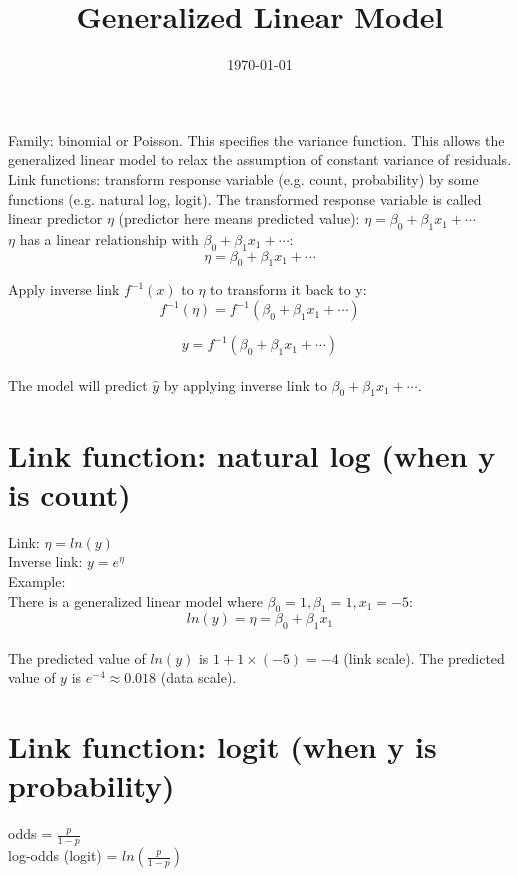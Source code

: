 \documentclass[12pt]{article}
\title{Generalized Linear Model}
\date{\today}
\begin{document}
\maketitle

Family: binomial or Poisson. This specifies the variance function. This allows the generalized linear model to relax the assumption of constant variance of residuals.\\

Link functions: transform response variable (e.g. count, probability) by some functions (e.g. natural log, logit). The transformed response variable is called linear predictor $\eta$ (predictor here means predicted value): $\eta = \beta_0 + \beta_1x_1 + \cdots$ \\

$\eta$ has a linear relationship with $\beta_0 + \beta_1x_1 + \cdots$:
\[ \eta = \beta_0 + \beta_1x_1 + \cdots \]

Apply inverse link $f^{-1}(x)$ to $\eta$ to transform it back to y: 
\[ f^{-1}(\eta) = f^{-1}(\beta_0 + \beta_1x_1 + \cdots) \]

\[ y = f^{-1}(\beta_0 + \beta_1x_1 + \cdots) \] \\

The model will predict $\hat{y}$ by applying inverse link to $\beta_0 + \beta_1x_1 + \cdots$. \\

\section{Link function: natural log (when y is count)}
Link: $\eta = ln(y)$ \\

Inverse link: $ y = e^\eta$ \\

Example: \\

There is a generalized linear model where $\beta_0 = 1, \beta_1 = 1, x_1 = -5$:
\[ ln(y) = \eta = \beta_0 + \beta_1x_1\] \\

The predicted value of $ln(y)$ is $1 + 1 \times (-5) = -4$ (link scale). The predicted value of $y$ is $e^{-4} \approx 0.018$ (data scale).


\section{Link function: logit (when y is probability)}
odds = $\frac{p}{1-p}$ \\
log-odds (logit) = $ln(\frac{p}{1-p})$ \\
\end{document}
